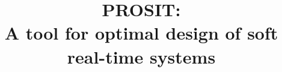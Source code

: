 \documentclass[11pt,a4paper,twoside,openright]{book}
\begin{document}
\title{PROSIT: \\A tool for optimal design of soft real-time systems}
\providecommand{\autore}{Gianluca Bortoli}
\providecommand{\principaladviser}{Prof. Luigi Palopoli}
\providecommand{\annoacc}{2014-2015}

\titlep

\frontmatter
{}

\tableofcontents

\clearpage
\pagestyle{headings}
\renewcommand{\chaptermark}[1]{\markboth{{\chaptername}\ \thechapter.\hspace{1em}#1}{}}

\mainmatter







\renewcommand{\chaptermark}[1]{\markboth{{\appendixname}\ \thechapter.\hspace{1em}#1}{}}

%



\end{document}
